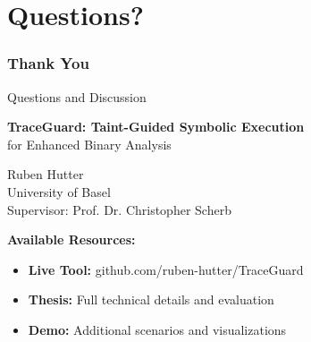\documentclass[aspectratio=169]{beamer}
\begin{document}
\section{Questions?}

\begin{frame}
    \frametitle{Thank You}
    \begin{center}
        \Large Questions and Discussion
        
        \vspace{2em}
        \normalsize
        \textbf{TraceGuard: Taint-Guided Symbolic Execution} \\
        for Enhanced Binary Analysis
        
        \vspace{1em}
        Ruben Hutter \\
        University of Basel \\
        Supervisor: Prof. Dr. Christopher Scherb
        
        \vspace{2em}
        \textbf{Available Resources:}
        \begin{itemize}
            \item \textbf{Live Tool:} github.com/ruben-hutter/TraceGuard
            \item \textbf{Thesis:} Full technical details and evaluation
            \item \textbf{Demo:} Additional scenarios and visualizations
        \end{itemize}
    \end{center}
\end{frame}
\end{document}
